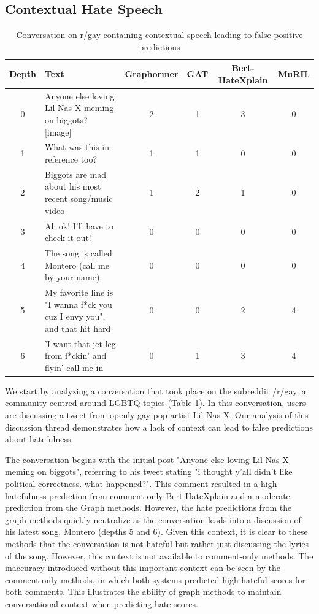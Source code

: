 \documentclass[letterpaper]{article} %
\begin{document}
\subsection{Contextual Hate Speech}
\begin{table}
\centering
\caption{Conversation on r/gay containing contextual speech leading to false positive predictions}
\begin{tabular}{c|p{8cm}|c|c|c|c}
Depth & Text & Graphormer & GAT & Bert-HateXplain & MuRIL \\
\hline
\hline
0 & Anyone else loving Lil Nas X meming on biggots? [image] & 2 & 1 & 3 & 0 \\
\hline
1 & What was this in reference too? & 1 & 1 & 0 & 0  \\
\hline
2 & Biggots are mad about his most recent song/music video & 1 & 2 & 1 & 0  \\
\hline
3 & Ah ok! I'll have to check it out! & 0 & 0 & 0 & 0 \\
\hline
4 & The song is called Montero (call me by your name). & 0 & 0 & 0 & 0 \\
\hline
5 & My favorite line is "I wanna f*ck you cuz I envy you", and that hit hard & 0 & 0 & 2 & 4 \\
\hline
6 & 'I want that jet leg from f*ckin' and flyin' call me in & 0 & 1 & 3 & 4 \\
\end{tabular}
\label{tab:contextual-gay}
\end{table}
We start by analyzing a conversation that took place on the subreddit /r/gay, a community centred around LGBTQ topics (Table \ref{tab:contextual-gay}). In this conversation, users are discussing a tweet from openly gay pop artist Lil Nas X. Our analysis of this discussion thread demonstrates how a lack of context can lead to false predictions about hatefulness.

The conversation begins with the initial post "Anyone else loving Lil Nas X meming on biggots", referring to his tweet stating "i thought y'all didn't like political correctness. what happened?". This comment resulted in a high hatefulness prediction from comment-only Bert-HateXplain and a moderate prediction from the Graph methods. However, the hate predictions from the graph methods quickly neutralize as the conversation leads into a discussion of his latest song, Montero (depths 5 and 6). Given this context, it is clear to these methods that the conversation is not hateful but rather just discussing the lyrics of the song. However, this context is not available to comment-only methods. The inaccuracy introduced without this important context can be seen by the comment-only methods, in which both systems predicted high hateful scores for both comments. This illustrates the ability of graph methods to maintain conversational context when predicting hate scores.
\end{document}
